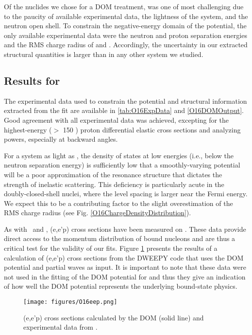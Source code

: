 Of the nuclides we chose for a DOM treatment, \oEight was one of most challenging due to the paucity of
available experimental data, the lightness of the system, and the neutron open shell.
To constrain the negative-energy domain
of the potential, the only available experimental data were the neutron and proton separation
energies and the RMS charge radius of \oEight and \neEight. Accordingly, the uncertainty in our
extracted structural quantities is larger than in any other system we studied.

\subsection{Results for \oSix}
The experimental data used to constrain the \oSix potential and structural information extracted
from the fit are available in \ref{tab:O16ExpData} and \ref{O16DOMOutput}. Good agreement with all 
experimental data was achieved, excepting for the highest-energy ($>$ 150 \mega\electronvolt)
proton differential elastic cross sections and analyzing powers, especially at backward angles.

For a system as light as \oSix, the density of states at low energies (i.e., below the neutron
separation energy) is sufficiently low that a smoothly-varying potential will be a poor
approximation of the resonance structure that dictates the strength of inelastic scattering. This
deficiency is particularly acute in the doubly-closed-shell nuclei, where the level spacing is
larger near the Fermi energy. We expect this to be a contributing factor to the slight
overestimation of the RMS charge radius (see Fig. \ref{O16ChargeDensityDistribution}).

As with \caForty\ and \pbEight, (e,e'p) cross sections have been measured on \oSix. These data
provide direct access to the momentum distribution of bound nucleons and are thus a critical test
for the validity of our fits. Figure \ref{O16eep} presents the results of a calculation of (e,e'p)
cross sections from the DWEEPY code \cite{DWEEPY} that uses the DOM potential and partial waves as input.
It is important to note that these data were not used in the fitting of the DOM potential for \oSix
and thus they give an indication of how well the DOM potential represents the underlying bound-state
physics.

\begin{figure}[tb]
    \centering
    \texttt{[image: figures/O16eep.png]}
    \caption[\oSix (e,e'p) cross sections calculated by the DOM]
    {
        \oSix (e,e'p) cross sections calculated by the DOM (solid line) and experimental data from
        \cite{Leuschner1994}.
    }
    \label{O16eep}
\end{figure}

